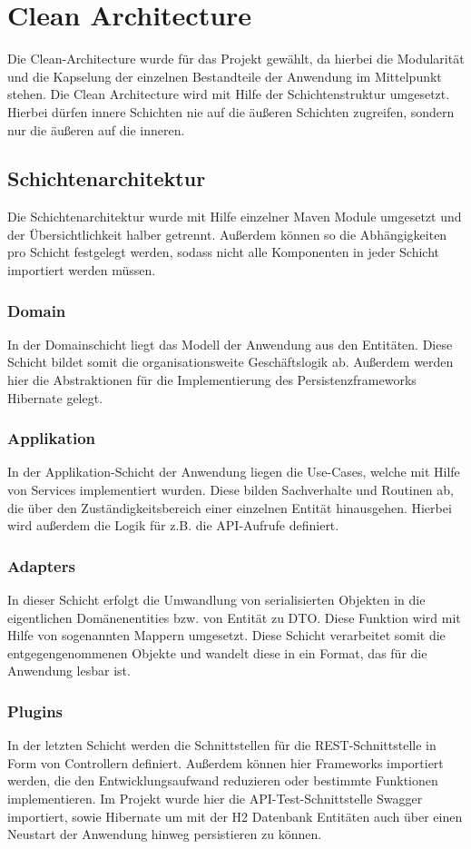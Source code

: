 \chapter{Clean Architecture}
Die Clean-Architecture wurde für das Projekt gewählt, da hierbei die Modularität und die Kapselung der einzelnen Bestandteile der Anwendung im Mittelpunkt stehen. Die Clean Architecture wird mit Hilfe der Schichtenstruktur umgesetzt. Hierbei dürfen innere Schichten nie auf die äußeren Schichten zugreifen, sondern nur die äußeren auf die inneren.

\section{Schichtenarchitektur}
Die Schichtenarchitektur wurde mit Hilfe einzelner Maven Module umgesetzt und der Übersichtlichkeit halber getrennt. Außerdem können so die Abhängigkeiten pro Schicht festgelegt werden, sodass nicht alle Komponenten in jeder Schicht importiert werden müssen.

    \subsection{Domain}
    In der Domainschicht liegt das Modell der Anwendung aus den Entitäten. Diese Schicht bildet somit die organisationsweite Geschäftslogik ab. Außerdem werden hier die Abstraktionen für die Implementierung des Persistenzframeworks Hibernate gelegt.
    
    \subsection{Applikation}
    In der Applikation-Schicht der Anwendung liegen die Use-Cases, welche mit Hilfe von Services implementiert wurden. Diese bilden Sachverhalte und Routinen ab, die über den Zuständigkeitsbereich einer einzelnen Entität hinausgehen. Hierbei wird außerdem die Logik für z.B. die API-Aufrufe definiert.
    
    \subsection{Adapters}
    In dieser Schicht erfolgt die Umwandlung von serialisierten Objekten in die eigentlichen Domänenentities bzw. von Entität zu DTO. Diese Funktion wird mit Hilfe von sogenannten Mappern umgesetzt. Diese Schicht verarbeitet somit die entgegengenommenen Objekte und wandelt diese in ein Format, das für die Anwendung lesbar ist.
    
    \subsection{Plugins} 
    In der letzten Schicht werden die Schnittstellen für die REST-Schnittstelle in Form von Controllern definiert. Außerdem können hier Frameworks importiert werden, die den Entwicklungsaufwand reduzieren oder bestimmte Funktionen implementieren. Im Projekt wurde hier die API-Test-Schnittstelle Swagger importiert, sowie Hibernate um mit der H2 Datenbank Entitäten auch über einen Neustart der Anwendung hinweg persistieren zu können.